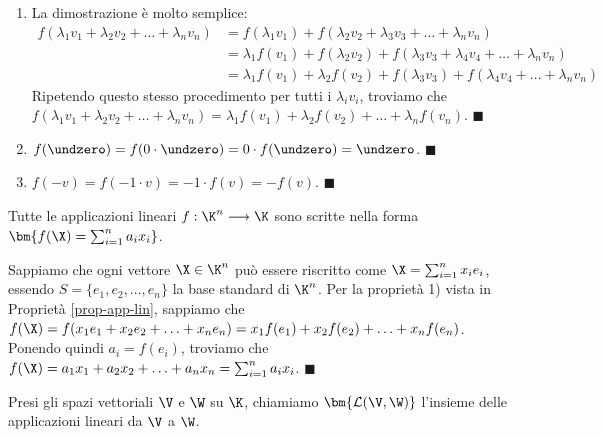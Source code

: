 \documentclass[11pt, a4paper, titlepage, oneside]{scrbook}
\begin{document}
\Dimostrazione \nopagebreak

\begin{enumerate}
    \item La dimostrazione è molto semplice:
    \begin{align*}
    f(\lambda_1 v_1 + \lambda_2 v_2 + \ldots + \lambda_n v_n) &= f(\lambda_1 v_1) + f(\lambda_2 v_2 + \lambda_3 v_3 + \ldots + \lambda_n v_n)  \\
     &= \lambda_1 f(v_1) + f(\lambda_2 v_2) + f(\lambda_3 v_3 + \lambda_4 v_4 + \ldots + \lambda_n v_n) \\
     &= \lambda_1 f(v_1) + \lambda_2 f(v_2) + f(\lambda_3 v_3) + f(\lambda_4 v_4 + \ldots + \lambda_n v_n)
    \end{align*}
    Ripetendo questo stesso procedimento per tutti i $\lambda_i v_i$, troviamo che \mbox{$f(\lambda_1 v_1 + \lambda_2 v_2 + \ldots + \lambda_n v_n) = \lambda_1 f(v_1) + \lambda_2 f(v_2) + \ldots + \lambda_n f(v_n)$}. $\blacksquare$
    \item $f(\undzero) = f(0 \cdot \undzero) = 0 \cdot f(\undzero) = \undzero$. $\blacksquare$
    \item $f(-v) = f(-1 \cdot v) = -1 \cdot f(v) = -f(v)$. $\blacksquare$
\end{enumerate}

\begin{Osservazione}[]
\label{oss-app-lin-2}
Tutte le applicazioni lineari $f: \K^n \longrightarrow \K$ sono scritte nella forma $\bm{f(\X) = \sum_{i = 1}^n a_i x_i}$.
\end{Osservazione}

\Dimostrazione \nopagebreak

Sappiamo che ogni vettore $\X \in \K^n$ può essere riscritto come $\X = \sum_{i = 1}^n x_i e_i$, essendo \mbox{$S = \{e_1, e_2, \ldots, e_n\}$} la base standard di $\K^n$. Per la proprietà 1) vista in Proprietà \ref{prop-app-lin}, sappiamo che $f(\X) = f(x_1 e_1 + x_2 e_2 + \ldots + x_n e_n) = x_1 f(e_1) + x_2 f(e_2) + \ldots + x_n f(e_n)$. Ponendo quindi $a_i = f(e_i)$, troviamo che $f(\X) = a_1 x_1 + a_2 x_2 + \ldots + a_n x_n = \sum_{i = 1}^n a_i x_i$. $\blacksquare$

\begin{Definizione}
\label{def-insieme-app-lin}
Presi gli spazi vettoriali $\V$ e $\W$ su $\K$, chiamiamo $\bm{\mathcal{L}(\V, \W)}$ l'insieme delle applicazioni lineari da $\V$ a $\W$.
\end{Definizione}
\end{document}
